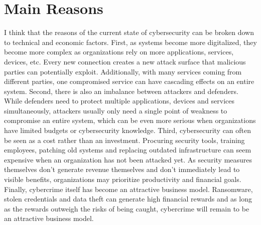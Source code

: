 \documentclass[12pt]{article}
\begin{document}
\section{Main Reasons}
I think that the reasons of the current state of cybersecurity can be broken down to technical and economic factors.
\newline
First, as systems become more digitalized, they become more complex as organizations rely on more applications, services, devices, etc. Every new connection creates a new attack surface that malicious parties can potentially exploit. Additionally, with many services coming from different parties, one compromised service can have cascading effects on an entire system.
\newline
Second, there is also an imbalance between attackers and defenders. While defenders need to protect multiple applications, devices and services simultaneously, attackers usually only need a single point of weakness to compromise an entire system, which can be even more serious when organizations have limited budgets or cybersecurity knowledge.
\newline
Third, cybersecurity can often be seen as a cost rather than an investment. Procuring security tools, training employees, patching old systems and replacing outdated infrastructure can seem expensive when an organization has not been attacked yet. As security measures themselves don't generate revenue themselves and don't immediately lead to visible benefits, organizations may prioritize productivity and financial goals.
Finally, cybercrime itself has become an attractive business model. Ransomware, stolen credentials and data theft can generate high financial rewards and as long as the rewards outweigh the risks of being caught, cybercrime will remain to be an attractive business model.



\end{document}
